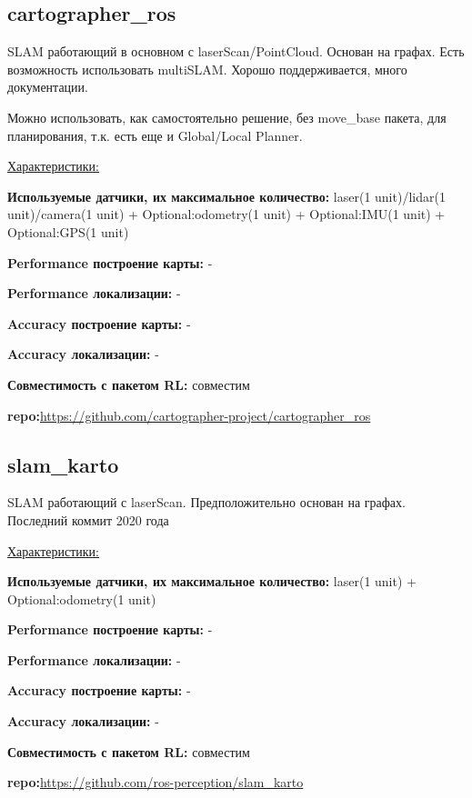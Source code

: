 \documentclass[a4paper, 14pt]{extreport}
\begin{document}
\subsection{cartographer\_ros}
\par SLAM работающий в основном с laserScan/PointCloud. Основан на графах. Есть возможность использовать multiSLAM. Хорошо поддерживается, много документации.
\par\noindent Можно использовать, как самостоятельно решение, без move\_base пакета, для планирования, т.к. есть еще и Global/Local Planner.
\vspace{2mm}
\par\noindent \underline{Характеристики:}
\par\textbf{Используемые датчики, их максимальное количество:} laser(1 unit)/lidar(1 unit)/camera(1 unit) + Optional:odometry(1 unit) + Optional:IMU(1 unit) + Optional:GPS(1 unit)
\par\textbf{Performance построение карты:} -
\par\textbf{Performance локализации:} -
\par\textbf{Accuracy построение карты:} -
\par\textbf{Accuracy локализации:} -
\par\textbf{Совместимость с пакетом RL:} совместим
\par\textbf{repo:}\url{https://github.com/cartographer-project/cartographer_ros}
\subsection{slam\_karto}
\par SLAM работающий с laserScan. Предположительно основан на графах. Последний коммит 2020 года
\vspace{2mm}
\par\noindent \underline{Характеристики:}
\par\textbf{Используемые датчики, их максимальное количество:} laser(1 unit) + Optional:odometry(1 unit)
\par\textbf{Performance построение карты:} -
\par\textbf{Performance локализации:} -
\par\textbf{Accuracy построение карты:} -
\par\textbf{Accuracy локализации:} -
\par\textbf{Совместимость с пакетом RL:} совместим
\par\textbf{repo:}\url{https://github.com/ros-perception/slam_karto}
\end{document}
